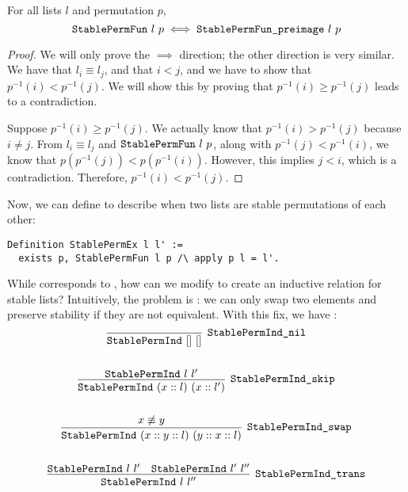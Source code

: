 \documentclass[sigplan,10pt,anonymous,review]{thesis}
\begin{document}
\begin{theorem}
  For all lists $l$ and permutation $p$,
  \begin{equation*}
    \texttt{\textup{StablePermFun}}~l~p \iff \texttt{\textup{StablePermFun\_preimage}}~l~p
  \end{equation*}
\end{theorem}
\begin{proof}
  We will only prove the $\implies$ direction; the other direction is
  very similar. We have that $l_i \equiv l_j$, and that $i < j$, and we
  have to show that $p^{-1}(i) < p^{-1}(j)$. We will show this by
  proving that $p^{-1}(i) \ge p^{-1}(j)$ leads to a contradiction.

  Suppose $p^{-1}(i) \ge p^{-1}(j)$. We actually know that $p^{-1}(i) >
  p^{-1}(j)$ because $i \neq j$. From $l_i \equiv l_j$ and
  $\texttt{\textup{StablePermFun}}~l~p$, along with $p^{-1}(j) < p^{-1}(i)$, we
  know that $p(p^{-1}(j)) < p(p^{-1}(i))$. However, this implies $j <
  i$, which is a contradiction. Therefore, $p^{-1}(i) < p^{-1}(j)$.
\end{proof}

Now, we can define  to describe when two lists are
stable permutations of each other:
\begin{lstlisting}
Definition StablePermEx l l' :=
  exists p, StablePermFun l p /\ apply p l = l'.
\end{lstlisting}

While  corresponds to , how can
we modify  to create an inductive relation for stable
lists? Intuitively, the problem is : we can
only swap two elements and preserve stability if they are not
equivalent. With this fix, we have :
\begin{gather*}
  \infer[\var{StablePermInd\_nil}]{\var{StablePermInd}~[]~[]}{}
  \\ \\
  \infer[\var{StablePermInd\_skip}]{\var{StablePermInd}~(x :: l)~(x :: l')}{%
    \var{StablePermInd}~l~l'
  }
  \\ \\
  \infer[\var{StablePermInd\_swap}]
        {\var{StablePermInd}~(x :: y :: l)~(y :: x :: l)}
        {x \not\equiv y}
  \\ \\
  \infer[\var{StablePermInd\_trans}]{\var{StablePermInd}~l~l''}{
    \var{StablePermInd}~l~l' & \var{StablePermInd}~l'~l''
  }
\end{gather*}
\end{document}
